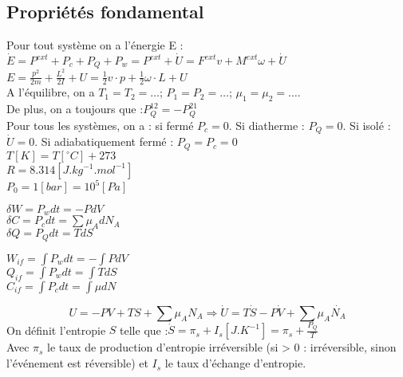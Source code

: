 \documentclass[../main.tex]{subfiles}
\begin{document}
\localtableofcontents
\subsection{Propriétés fondamental}


Pour tout système on a l'énergie E : $\dot{E} = P^{ext} + P_c + P_Q + P_w = P^{ext} + \dot{U} = F^{ext}v + M^{ext} \omega + \dot{U}$\\
$E =\frac{p^2}{2m} + \frac{L^2}{2I} + U = \frac{1}{2} v \cdot p + \frac{1}{2} \omega \cdot L + U$\\
A l'équilibre, on a $T_1 = T_2 = \dots$; $P_1 = P_2 = \dots$; $\mu_1 = \mu_2 = \dots$.\\
De plus, on a toujours que :$P_Q^{12} = -P_Q^{21}$\\

Pour tous les systèmes, on a : si fermé $P_c = 0$. Si diatherme : $P_Q = 0$. Si isolé : $\dot{U} = 0$. Si adiabatiquement fermé : $P_Q = P_c = 0$\\
$T[K] = T[^{\circ}C] + 273$\\
$R = 8.314[J.kg^{-1}.mol^{-1}]$\\
$P_0 = 1[bar] = 10^5[Pa]$\\

\begin{minipage}{.5\textwidth}
    $\delta W = P_wdt = -PdV$\\
    $\delta C = P_c dt = \sum \mu_A dN_A$\\
    $\delta Q = P_Q dt = TdS$\\
\end{minipage}
\hfill
\begin{minipage}{.5\textwidth}
    $W_{if} = \int P_wdt = -\int PdV$\\
    $Q_{if} = \int P_wdt = \int TdS$\\
    $C_{if} = \int P_cdt = \int \mu dN$\\
\end{minipage}

\begin{equation}
    U = -PV + TS + \sum \mu_A N_A \Rightarrow \dot{U} = T\dot{S} - P\dot{V} + \sum \mu_A \dot{N_A}
\end{equation}
On définit l'entropie $S$ telle que :$\dot{S} = \pi_s + I_s[J.K^{-1}] = \pi_s + \frac{P_Q}{T}$\\
Avec $\pi_s$ le taux de production d'entropie irréversible (si > 0 : irréversible, sinon l'événement est réversible) et $I_s$ le taux d'échange d'entropie.\\
\end{document}
